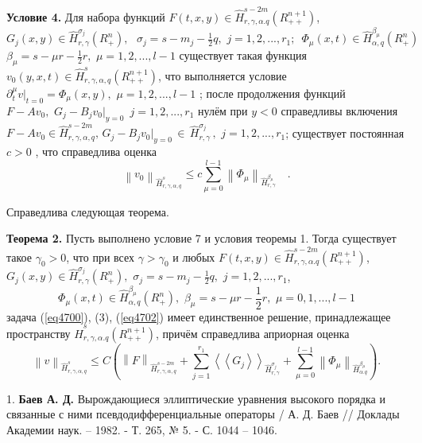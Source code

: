 \textbf{Условие 4. }Для набора функций $F(t,x,y) \in \hat {H}_{r,\gamma
,\alpha .q}^{s - 2m} (R_{ + + }^{n + 1} )$, $G_j (x,y) \in \hat
{H}_{r,\gamma }^{\sigma _j } (R_ + ^n ),\,\,\,\,\sigma _j = s - m_j -
\frac{1}{2}q,\,\,j = 1,2,...,r_1 ;\,\,\,\Phi _\mu (x,t) \in \hat {H}_{\alpha
,q}^{\beta _\mu } (R_ + ^n )$
$\beta _\mu = s - \mu r - \frac{1}{2}r,\,\,\mu = 1,2,...,l -1$
существует такая функция
$v_0 (y,x,t) \in \hat {H}_{r,\gamma ,\alpha ,q}^s (R_{ + + }^{n + 1}
)$,
что
выполняется условие $\partial _t^\mu \left. v \right|_{t = 0} = \Phi _\mu
(x,y),\,\,\mu = 1,2,...,l - 1$ ;
после продолжения функций $F - Av_0 ,\,\,G_j - B_j v_0 \vert _{y = 0}
\,\,\,j = 1,2,...,r_1 $ нулём при $y < 0$ справедливы включения $F - Av_0 \in
\hat {H}_{r,\gamma ,\alpha ,q}^{s - 2m} ,\,G_j - B_j v_0 \vert _{y = 0} \,
\in \,\hat {H}_{r,\gamma }^{\sigma _j } \,,\,\,j = 1,2,...,r_1 $;
существует постоянная $c > 0$ , что справедлива оценка
\[
\left\| {v_0 } \right\|_{\hat {H}_{r,\gamma ,\alpha ,q}^s } \leqslant
c\sum\limits_{\mu = 0}^{l - 1} {\left\| {\Phi _\mu } \right\|} _{\hat
{H}_{r,\gamma }^{\beta _\mu } } \quad .
\]







Справедлива следующая теорема.

\textbf{Теорема 2. }Пусть выполнено условие 7 и условия теоремы 1. Тогда
существует такое $\gamma _0 > 0$, что при всех $\gamma > \gamma _0 $ и любых
$F(t,x,y) \in \hat {H}_{r,\gamma ,\alpha .q}^{s - 2m} (R_{ + + }^{n + 1} )$,
$G_j (x,y) \in \hat {H}_{r,\gamma }^{\sigma _j } (R_ + ^n ),\,\,\sigma _j =
s - m_j - \frac{1}{2}q,\,\,j = 1,2,...,r_1 $,
\[
\Phi _\mu (x,t) \in \hat {H}_{\alpha ,q}^{\beta _\mu } (R_ + ^n ),\,\,\beta
_\mu = s - \mu r - \frac{1}{2}r,\,\,\mu = 0,1,...,l - 1
\]
задача (\ref{eq4700}), (3), (\ref{eq4702}) имеет единственное решение, принадлежащее пространству
$\hat {H}_{r,\gamma ,\alpha .q}^s (R_{ + + }^{n + 1} )$, причём справедлива
априорная оценка
\[
\left\| v \right\|_{\hat {H}_{r,\gamma ,\alpha ,q}^s } \leqslant C(\left\| F
\right\|_{\hat {H}_{r,\gamma ,\alpha ,q}^{s - 2m} } + \sum\limits_{j =
1}^{r_1 } {\left\langle {\left\langle {G_j } \right\rangle } \right\rangle }
_{\hat {H}_{r,\gamma }^{\sigma _j } } + \sum\limits_{\mu = 0}^{l - 1}
{\left\| {\Phi _\mu } \right\|} _{\hat {H}_{\alpha .q}^{\beta _\mu } } ) .
\]



\litlist

1. {\bf Баев А. Д.} Вырождающиеся эллиптические уравнения высокого порядка и
связанные с ними псевдодифференциальные операторы / А. Д. Баев // Доклады
Академии наук. -- 1982. - Т. 265, № 5. - С. 1044 -- 1046.

